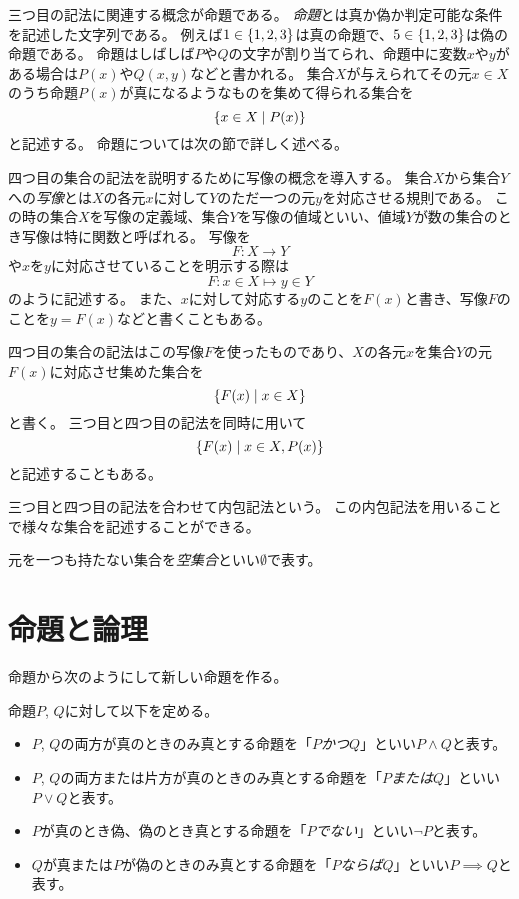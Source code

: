 三つ目の記法に関連する概念が命題である。
\emph{命題}とは真か偽か判定可能な条件を記述した文字列である。
例えば$1 \in \{ 1, 2, 3 \}$は真の命題で、$5 \in \{ 1, 2, 3 \}$は偽の命題である。
命題はしばしば$P$や$Q$の文字が割り当てられ、命題中に変数$x$や$y$がある場合は$P(x)$や$Q(x, y)$などと書かれる。
集合$X$が与えられてその元$x \in X$のうち命題$P(x)$が真になるようなものを集めて得られる集合を
$$
\{ x \in X \mid P(x) \}
$$
と記述する。
命題については次の節で詳しく述べる。

四つ目の集合の記法を説明するために写像の概念を導入する。
集合$X$から集合$Y$への\emph{写像}とは$X$の各元$x$に対して$Y$のただ一つの元$y$を対応させる規則である。
この時の集合$X$を写像の定義域、集合$Y$を写像の値域といい、値域$Y$が数の集合のとき写像は特に関数と呼ばれる。
写像を
$$
F: X \to Y
$$
や$x$を$y$に対応させていることを明示する際は
$$
F: x \in X \mapsto y \in Y
$$
のように記述する。
また、$x$に対して対応する$y$のことを$F(x)$と書き、写像$F$のことを$y = F(x)$などと書くこともある。

四つ目の集合の記法はこの写像$F$を使ったものであり、$X$の各元$x$を集合$Y$の元$F(x)$に対応させ集めた集合を
$$
\{ F(x) \mid x \in X\}
$$
と書く。
三つ目と四つ目の記法を同時に用いて
$$
\{ F(x) \mid x \in X, P(x) \}
$$
と記述することもある。

三つ目と四つ目の記法を合わせて内包記法という。
この内包記法を用いることで様々な集合を記述することができる。

元を一つも持たない集合を\emph{空集合}といい$\emptyset$で表す。

\section{命題と論理}

命題から次のようにして新しい命題を作る。

\begin{definition}[命題の演算]
命題$P$, $Q$に対して以下を定める。
\begin{itemize}
\item
$P$, $Q$の両方が真のときのみ真とする命題を「$P$\emph{かつ}$Q$」といい$P \land Q$と表す。
\item
$P$, $Q$の両方または片方が真のときのみ真とする命題を「$P$\emph{または}$Q$」といい$P \lor Q$と表す。
\item
$P$が真のとき偽、偽のとき真とする命題を「$P$\emph{でない}」といい$\lnot P$と表す。
\item
$Q$が真または$P$が偽のときのみ真とする命題を「$P$\emph{ならば}$Q$」といい$P \implies Q$と表す。
\end{itemize}
\end{definition}


